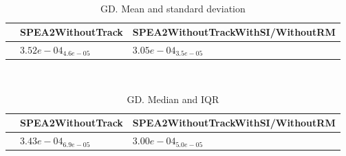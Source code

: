\documentclass{article}
\begin{document}
\
\begin{table}
\caption{GD. Mean and standard deviation}
\label{table:mean.GD}
\centering
\begin{scriptsize}
\begin{tabular}{lll}
\hline & SPEA2WithoutTrack &  SPEA2WithoutTrackWithSI/WithoutRM\\
\hline
 & \cellcolor{gray25}$  3.52e-04_{ 4.6e-05}$ & \cellcolor{gray95}$  3.05e-04_{ 3.5e-05}$ \\
\hline
\end{tabular}
\end{scriptsize}
\end{table}
\
\begin{table}
\caption{GD. Median and IQR}
\label{table:median.GD}
\begin{scriptsize}
\centering
\begin{tabular}{lll}
\hline & SPEA2WithoutTrack &  SPEA2WithoutTrackWithSI/WithoutRM\\
\hline
 & \cellcolor{gray25}$  3.43e-04_{ 6.9e-05}$ & \cellcolor{gray95}$  3.00e-04_{ 5.0e-05}$ \\
\hline
\end{tabular}
\end{scriptsize}
\end{table}
\end{document}
